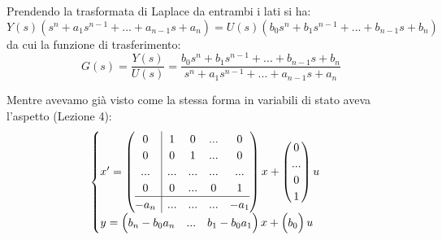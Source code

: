 \documentclass[a4paper,11pt]{article}
\begin{document}
Prendendo la trasformata di Laplace da entrambi i lati si ha:
$$
Y(s) \left( s^n + a_1 s^{n - 1} + ... + a_{n - 1} s + a_n \right) = U(s) \left( b_0 s^n + b_1 s^{n - 1} + ... + b_{n - 1} s + b_n \right)
$$
da cui la funzione di trasferimento:
$$
G(s) = \frac{Y(s)}{U(s)} = \frac{ b_0 s^n + b_1 s^{n - 1} + ... + b_{n - 1} s + b_n}{s^n + a_1 s^{n - 1} + ... + a_{n - 1} s + a_n }
$$

Mentre avevamo già visto come la stessa forma in variabili di stato aveva l'aspetto (Lezione 4):
\[
	\begin{cases}	
x' = \left(\begin{array}{@{}c | cccc@{}}
	0 & 1 & 0 & ... & 0 \\
	0 & 0 & 1 & ... & 0 \\
	... & ... & ... & ... & ... \\
	0 & 0 & ... & 0 & 1 \\
	\hline
	-a_n & ... & ... & ... & -a_1
\end{array}\right)
x + \begin{pmatrix}
0 \\
... \\
0 \\
1
\end{pmatrix} u \\ 
y = \begin{pmatrix}
	b_n - b_0 a_n & ... & b_1 - b_0 a_1	
\end{pmatrix} x + \begin{pmatrix}
b_0
\end{pmatrix} u
	\end{cases}
\]
\end{document}
